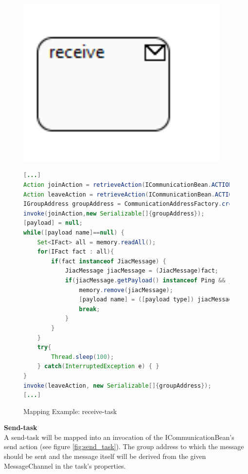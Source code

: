 \begin{figure}[h]
\begin{minipage}[c]{0.3\textwidth}
\includegraphics[width=0.95\textwidth]{images/mapping/receiveTask.png}
\end{minipage}
\begin{minipage}[c]{0.7\textwidth}
\begin{lstlisting}[language=Java]
[...]
Action joinAction = retrieveAction(ICommunicationBean.ACTION_JOIN_GROUP);
Action leaveAction = retrieveAction(ICommunicationBean.ACTION_LEAVE_GROUP);
IGroupAddress groupAddress = CommunicationAddressFactory.createGroupAddress([address]);
invoke(joinAction,new Serializable[]{groupAddress});
[payload] = null;
while([payload name]==null) {
	Set<IFact> all = memory.readAll();
	for(IFact fact : all){
		if(fact instanceof JiacMessage) {
			JiacMessage jiacMessage = (JiacMessage)fact;
			if(jiacMessage.getPayload() instanceof Ping && jiacMessage.getHeader(IJiacMessage.Header.SEND_TO).equals(groupAddress)) {
				memory.remove(jiacMessage);
				[payload name] = ([payload type]) jiacMessage.getPayload();
				break;
			}
		}
	}
	try{
		Thread.sleep(100);
	} catch(InterruptedException e) { }
}
invoke(leaveAction, new Serializable[]{groupAddress});
[...]
\end{lstlisting}
\end{minipage}
\caption{Mapping Example: receive-task}%
\label{fig:receive_task}%
\end{figure}

\textbf{Send-task}\\
A send-task will be mapped into an invocation of the ICommunicationBean's send action (see figure \ref{fig:send_task}). The group address to which the message should be sent and the message itself will be derived from the given MessageChannel in the task's properties. \\\\
 
